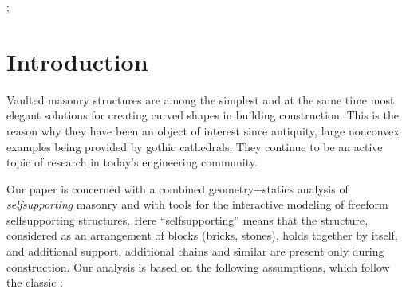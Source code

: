 \documentclass[review]{acmsiggraph}
\newcommand{\todo}[1]{\textcolor{red}{#1}}
\begin{document}

\begin{CRcatlist}
  ;
\end{CRcatlist}


\keywordlist


\TOGlinkslist


\copyrightspace



\section{Introduction}



Vaulted masonry structures are among the simplest and at the same time 
most elegant solutions for creating curved shapes in building 
construction. This is the reason why they have been an object of interest 
since antiquity, large non\dash convex examples being provided by gothic 
cathedrals. They continue to be an active topic of research in today's 
engineering community.


Our paper is concerned with a combined geometry+statics analysis of {\em 
self\dash supporting} masonry and with tools for the interactive modeling 
of freeform self\dash supporting structures. Here ``self\dash supporting'' 
means that the structure, considered as an arrangement of blocks (bricks, 
stones), holds together by itself, and additional support, additional 
chains and similar are present only during construction. Our analysis is 
based on the following assumptions, which follow the classic 
\cite{Heyman66}:
\end{document}
